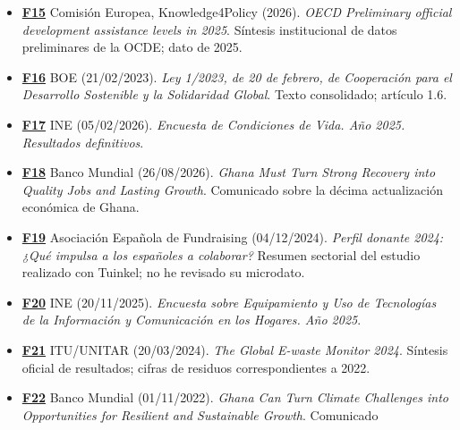 \documentclass[
]{article}
\providecommand{\tightlist}{%
  \setlength{\itemsep}{0pt}\setlength{\parskip}{0pt}}
\begin{document}
\begin{itemize}
\tightlist
\item
  \textbf{\href{https://knowledge4policy.ec.europa.eu/publication/oecd-preliminary-official-development-assistance-levels-2025_en}{F15}}
  Comisión Europea, Knowledge4Policy (2026). \emph{OECD Preliminary
  official development assistance levels in 2025}. Síntesis
  institucional de datos preliminares de la OCDE; dato de 2025.
\item
  \textbf{\href{https://www.boe.es/buscar/act.php?id=BOE-A-2023-4512}{F16}}
  BOE (21/02/2023). \emph{Ley 1/2023, de 20 de febrero, de Cooperación
  para el Desarrollo Sostenible y la Solidaridad Global}. Texto
  consolidado; artículo 1.6.
\item
  \textbf{\href{https://www.ine.es/dyngs/Prensa/es/ECV2025.htm}{F17}}
  INE (05/02/2026). \emph{Encuesta de Condiciones de Vida. Año 2025.
  Resultados definitivos}.
\item
  \textbf{\href{https://www.worldbank.org/en/news/press-release/2026/08/26/ghana-must-turn-strong-recovery-into-quality-jobs-and-lasting-growth}{F18}}
  Banco Mundial (26/08/2026). \emph{Ghana Must Turn Strong Recovery into
  Quality Jobs and Lasting Growth}. Comunicado sobre la décima
  actualización económica de Ghana.
\item
  \textbf{\href{https://www.aefundraising.org/perfil-donante-2024-que-impulsa-a-los-espanoles-a-colaborar/}{F19}}
  Asociación Española de Fundraising (04/12/2024). \emph{Perfil donante
  2024: ¿Qué impulsa a los españoles a colaborar?} Resumen sectorial del
  estudio realizado con Tuinkel; no he revisado su microdato.
\item
  \textbf{\href{https://www.ine.es/dyngs/Prensa/es/TICH2025.htm}{F20}}
  INE (20/11/2025). \emph{Encuesta sobre Equipamiento y Uso de
  Tecnologías de la Información y Comunicación en los Hogares. Año
  2025}.
\item
  \textbf{\href{https://www.itu.int/en/ITU-D/Environment/Pages/Publications/The-Global-E-waste-Monitor-2024.aspx}{F21}}
  ITU/UNITAR (20/03/2024). \emph{The Global E-waste Monitor 2024}.
  Síntesis oficial de resultados; cifras de residuos correspondientes a
  2022.
\item
  \textbf{\href{https://www.worldbank.org/en/news/press-release/2022/11/01/ghana-can-turn-climate-challenges-into-opportunities-for-resilient-and-sustainable-growth-says-new-world-bank-group-report}{F22}}
  Banco Mundial (01/11/2022). \emph{Ghana Can Turn Climate Challenges
  into Opportunities for Resilient and Sustainable Growth}. Comunicado

\end{itemize}
\end{document}
